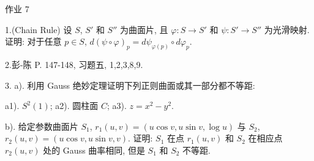 \documentclass[11pt]{ctexart}
\begin{document}
\begin{center}
{\Large 作业 7}
\end{center}

1.(Chain Rule) 设 $S$, $S'$ 和 $S''$ 为曲面片, 且 $\varphi:S\to{S}'$ 和 $\psi:S'\to{S}''$ 为光滑映射. 证明: 对于任意 $p\in{S}$, $d(\psi\circ\varphi)_p=d\psi_{\varphi(p)}\circ d\varphi_p$.

2.彭-陈 P. 147-148, 习题五, 1,2,3,8,9.

3. a). 利用 Gauss 绝妙定理证明下列正则曲面或其一部分都不等距:

a1). $S^2(1)$; a2). 圆柱面 $C$; a3). $z=x^2-y^2$.

b). 给定参数曲面片 $S_1$, $r_1(u,v)=(u\cos{v},u\sin{v},\log{u})$ 与 $S_2$, $r_2(u,v)=(u\cos{v},u\sin{v},v)$. 证明: $S_1$ 在点 $r_1(u,v)$ 和 $S_2$ 在相应点 $r_2(u,v)$ 处的 Gauss 曲率相同, 但是 $S_1$ 和 $S_2$ 不等距.
\end{document}
